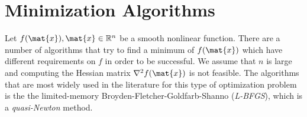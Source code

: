 
%
%
%

\chapter{Minimization Algorithms}\label{chapter:ref:Minimization}
Let $f(\mat{x}), \mat{x} \in \mathbb{R}^n$ be a smooth nonlinear function.
There are a number of algorithms that try to find a minimum of $f(\mat{x})$
which have different requirements on $f$ in order to be successful.
We assume that $n$ is large and computing the Hessian matrix
$\nabla^2 f(\mat{x})$ is not feasible.
The algorithms that are most widely used in the literature for this type of
optimization problem is the 
the limited-memory Broyden-Fletcher-Goldfarb-Shanno (\emph{L-BFGS}),
which is a \emph{quasi-Newton} method.

% 


